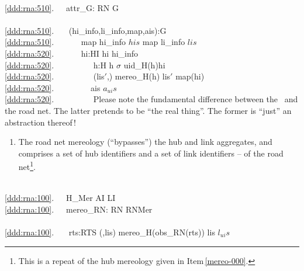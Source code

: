 {\\
\ref{ddd:rna:510}.\ \ \ attr\_G: RN {\RIGHTARROW} G\\
\\
\ref{ddd:rna:510}.\ \ \ {\ALL} (hi\_info,li\_info,map,ais):G {\RDOT} \\
\ref{ddd:rna:510}.\ \ \ \ \ \  map {\EQ}  hi\_info {\EQ} $his$ {\WEDGE} {\UNION}  map {\EQ}  li\_info {\EQ} $lis$ {\WEDGE}\\
\ref{ddd:rna:520}.\ \ \ \ \ \ {\ALL} hi:HI {\RDOT} hi {\ISIN}  hi\_info {\DBLRIGHTARROW}\\
\ref{ddd:rna:520}.\ \ \ \ \ \ \ \ \  h:H {\RDOT} h {\ISIN} $\sigma$ {\WEDGE} uid\_H(h){\EQ}hi \\
\ref{ddd:rna:520}.\ \ \ \ \ \ \ \ \  (lis$'$,{\DOTDOTDOT}) {\EQ} mereo\_H(h)  lis$'$ {\EQ} map(hi)\ \ \\
\ref{ddd:rna:520}.\ \ \ \ \ \ \ \ \ ais {\SUBSETEQ} $a{_{ui}}s$\footnotemark {\WEDGE} {\DOTDOTDOT}\\
\ref{ddd:rna:520}.\ \ \ \ \ \ \ \ \  
\ep
{}
\mnewfoil 
\noindent
\begynd
\pind Please note the fundamental difference between
\begynd
\pind the \rngraph\ and
\pind the road net.
\afslut
\pind The latter pretends to be ``the real thing''.
\pind The former is ``just'' an abstraction thereof\,!
\afslut
\mnewfoil                       
\begin{enumerate}\setei
\item \label{ddd:rna:100} The road net mereology (``bypasses'') the
                          hub and link aggregates, and comprises a set
                          of hub identifiers and a set of link
                          identifiers -- of the road
                          net\footnote{\LLLL This is a repeat of the
                          hub mereology given in Item\,\vref{mereo-000}.}.
\savei\end{enumerate}            
\bp
{}\\
\ref{ddd:rna:100}.\ \ \ H\_Mer {\EQ} AI {\TIMES} LI\\
\ref{ddd:rna:100}.\ \ \ mereo\_RN: RN {\RIGHTARROW} RNMer\\
\\
\ref{ddd:rna:100}.\ \ \ {\ALL} rts:RTS {\RDOT}  ({\UNDERLINE},lis) {\EQ} mereo\_H(obs\_RN(rts))  lis {\SUBSETEQ} $l_{ui}s$\footnotemark {}
\ep
{}
\mnewfoil

}
